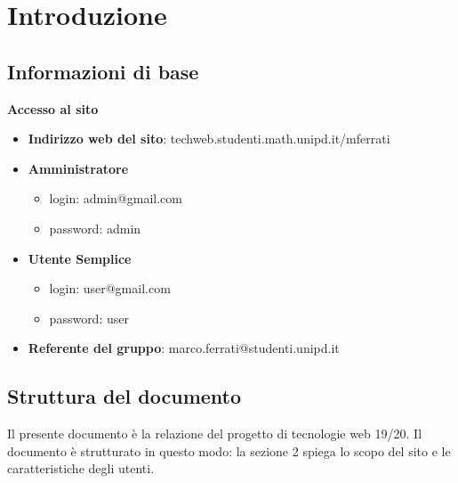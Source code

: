 \documentclass[1_relazione.tex]{subfiles}
\begin{document}
\section{Introduzione}

\subsection{Informazioni di base}
\textbf{Accesso al sito}

\begin{itemize}
\item \textbf{Indirizzo web del sito}: techweb.studenti.math.unipd.it/mferrati 
\item \textbf{Amministratore}
	\begin{itemize}
	\item login: admin@gmail.com
	\item password: admin
	\end{itemize}
\item \textbf{Utente Semplice}
	\begin{itemize}
	\item login: user@gmail.com
	\item password: user
	\end{itemize}
\item \textbf{Referente del gruppo}: marco.ferrati@studenti.unipd.it 
\end{itemize}

\subsection{Struttura del documento}
Il presente documento è la relazione del progetto di tecnologie web 19/20. Il documento è strutturato in questo modo: la sezione 2 spiega lo scopo del sito e le caratteristiche degli utenti.
 
\end{document}
